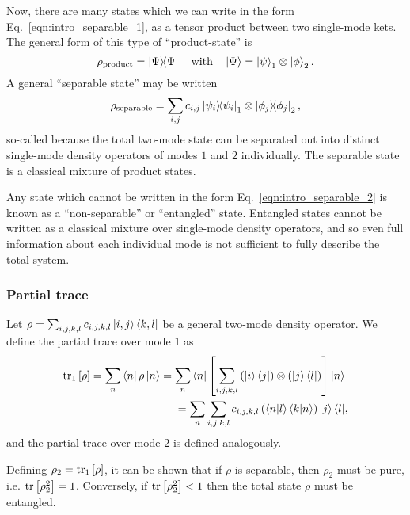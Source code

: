 Now, there are many states which we can write in the form Eq.~\ref{eqn:intro_separable_1}, as a tensor product between two single-mode kets. The general form of this type of ``product-state'' is
\begin{equation}
\rho_{\text{product}} = \dyad{\Psi} \qq{with} \ket{\Psi} = \ket{\psi}_1 \otimes \ket{\phi}_2.
\end{equation}
A general ``separable state'' may be written
\begin{equation}\label{eqn:intro_separable_2}
\rho_{\text{separable}} = \sum_{i, j} c_{i, j} \dyad{\psi_i}_1 \otimes \dyad{\phi_j}_2,
\end{equation}
so-called because the total two-mode state can be separated out into distinct single-mode density operators of modes $1$ and $2$ individually. The separable state is a classical mixture of product states.

Any state which cannot be written in the form Eq.~\ref{eqn:intro_separable_2} is known as a ``non-separable'' or ``entangled'' state. Entangled states cannot be written as a classical mixture over single-mode density operators, and so even full information about each individual mode is not sufficient to fully describe the total system.

\subsubsection{Partial trace}
Let $\rho = \sum_{i, j, k, l} c_{i, j, k, l} \ket{i, j}\bra{k, l}$ be a general two-mode density operator. We define the partial trace over mode $1$ as
\begin{align*}
\tr_1\left[\rho\right] = \sum_n \bra{n}\rho\ket{n} = \sum_n \bra{n} \left[\sum_{i, j, k, l} \left(\ket{i}\bra{j}\right) \otimes \left(\ket{j}\bra{l}\right) \right] \ket{n}& \\
= \sum_n \sum_{i, j, k, l} c_{i, j, k, l} \left(\ip{n}{l} \ip{k}{n} \right) \ket{j}\bra{l}&,
\end{align*}
and the partial trace over mode $2$ is defined analogously.

Defining $\rho_2 = \tr_1\left[\rho\right]$, it can be shown that if $\rho$ is separable, then $\rho_2$ must be pure, i.e. $\tr\left[\rho_2^2\right]=1$. Conversely, if $\tr\left[\rho_2^2\right] < 1$ then the total state $\rho$ must be entangled.







\FloatBarrier
